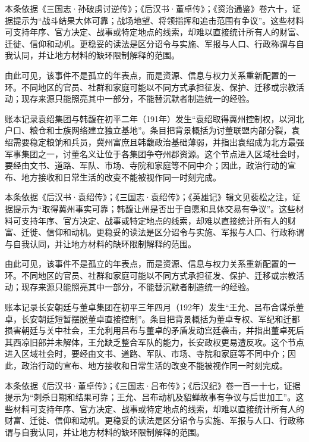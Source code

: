 本条依据《三国志·孙破虏讨逆传》；《后汉书·董卓传》；《资治通鉴》卷六十，证据提示为“战斗结果大体可靠；战场地望、将领指挥和追击范围有争议”。这些材料可支持年序、官方决定、战事或特定地点的线索，却难以直接统计所有人的财富、迁徙、信仰和动机。更稳妥的读法是区分诏令与实施、军报与人口、行政称谓与自我认同，并让地方材料的缺环限制解释的范围。

由此可见，该事件不是孤立的年表点，而是资源、信息与权力关系重新配置的一环。不同地区的官员、社群和家庭可能以不同方式承担征发、保护、迁移或宗教活动；现存来源只能照亮其中一部分，不能替沉默者制造统一的经验。

账本记录袁绍集团与韩馥在初平二年（191年）发生“袁绍取得冀州控制权，以河北户口、粮仓和士族网络建立独立基地”。条目把背景概括为讨董联盟内部分裂，袁绍需要稳定粮饷和兵员，冀州富庶且韩馥政治基础薄弱，并指出袁绍成为北方最强军事集团之一，讨董名义让位于各集团争夺州郡资源。这个节点进入区域社会时，要经由文书、道路、军队、市场、寺院和家庭等不同中介；因此，政治行动的宣布、地方接收和日常生活的改变不能被视作同一时刻完成。

本条依据《后汉书·袁绍传》；《三国志·袁绍传》；《英雄记》辑文见裴松之注，证据提示为“取得冀州事实可靠；韩馥让州是否出于自愿和具体交易有争议”。这些材料可支持年序、官方决定、战事或特定地点的线索，却难以直接统计所有人的财富、迁徙、信仰和动机。更稳妥的读法是区分诏令与实施、军报与人口、行政称谓与自我认同，并让地方材料的缺环限制解释的范围。

由此可见，该事件不是孤立的年表点，而是资源、信息与权力关系重新配置的一环。不同地区的官员、社群和家庭可能以不同方式承担征发、保护、迁移或宗教活动；现存来源只能照亮其中一部分，不能替沉默者制造统一的经验。

账本记录长安朝廷与董卓集团在初平三年四月（192年）发生“王允、吕布合谋杀董卓，长安朝廷短暂摆脱董卓直接控制”。条目把背景概括为董卓专权、军纪和迁都损害朝廷与关中社会，王允利用吕布与董卓的矛盾发动宫廷袭击，并指出董卓死后其西凉旧部并未解体，王允缺乏整合军队的能力，长安政权更易遭反攻。这个节点进入区域社会时，要经由文书、道路、军队、市场、寺院和家庭等不同中介；因此，政治行动的宣布、地方接收和日常生活的改变不能被视作同一时刻完成。

本条依据《后汉书·董卓传》；《三国志·吕布传》；《后汉纪》卷一百一十七，证据提示为“刺杀日期和结果可靠；王允、吕布动机及貂蝉故事有争议与后世加工”。这些材料可支持年序、官方决定、战事或特定地点的线索，却难以直接统计所有人的财富、迁徙、信仰和动机。更稳妥的读法是区分诏令与实施、军报与人口、行政称谓与自我认同，并让地方材料的缺环限制解释的范围。

